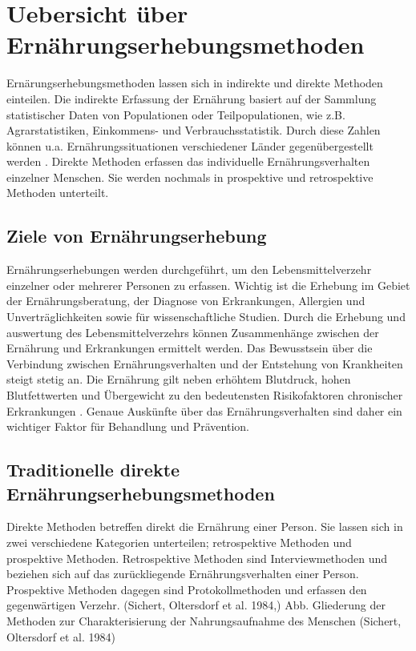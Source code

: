 \section{Uebersicht über Ernährungserhebungsmethoden}

Ernärungserhebungsmethoden lassen sich in indirekte und direkte Methoden einteilen. Die indirekte Erfassung der Ernährung basiert auf der Sammlung statistischer Daten von Populationen oder Teilpopulationen, wie z.B. Agrarstatistiken, Einkommens- und Verbrauchsstatistik. Durch diese Zahlen können u.a. Ernährungssituationen verschiedener Länder gegenübergestellt werden \cite{muller2007ernahrungsmedizinische}. Direkte Methoden erfassen das individuelle Ernährungsverhalten einzelner Menschen. Sie werden nochmals in prospektive und retrospektive Methoden unterteilt. 


\subsection{Ziele von Ernährungserhebung}

Ernährungserhebungen werden durchgeführt, um den Lebensmittelverzehr einzelner oder mehrerer Personen zu erfassen. Wichtig ist die Erhebung im Gebiet der Ernährungsberatung, der Diagnose von Erkrankungen, Allergien und Unverträglichkeiten sowie für wissenschaftliche Studien. Durch die Erhebung und auswertung des Lebensmittelverzehrs können Zusammenhänge zwischen der Ernährung und Erkrankungen ermittelt werden. Das Bewusstsein über die Verbindung zwischen Ernährungsverhalten und der Entstehung von Krankheiten steigt stetig an. Die Ernährung gilt neben erhöhtem Blutdruck, hohen Blutfettwerten und Übergewicht zu den bedeutensten Risikofaktoren chronischer Erkrankungen \cite{hurrelmann2004einfuhrung}. Genaue Auskünfte über das Ernährungsverhalten sind daher ein wichtiger Faktor für Behandlung und Prävention. 

\subsection{Traditionelle direkte Ernährungserhebungsmethoden}

Direkte Methoden betreffen direkt die Ernährung einer Person.  Sie lassen sich in zwei verschiedene Kategorien unterteilen; retrospektive Methoden und prospektive Methoden. Retrospektive Methoden sind Interviewmethoden und beziehen sich auf das zurückliegende Ernährungsverhalten einer Person.  Prospektive Methoden dagegen sind Protokollmethoden und erfassen den gegenwärtigen Verzehr. (Sichert, Oltersdorf et al. 1984,)
Abb. Gliederung der Methoden zur Charakterisierung der Nahrungsaufnahme des Menschen (Sichert, Oltersdorf et al. 1984)

